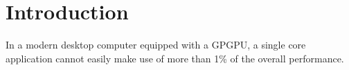 \chapter{Introduction}

In a modern desktop computer equipped with a GPGPU, a single core application cannot easily make use of more than 1\% of the overall performance. 